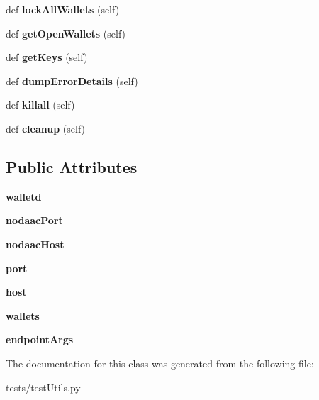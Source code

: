 \begin{DoxyCompactItemize}
def {\bfseries lock\+All\+Wallets} (self)
\item 
\mbox{\label{classtest_utils_1_1_wallet_mgr_aeb24c45ee41956221900c215dafb027b}} 
def {\bfseries get\+Open\+Wallets} (self)
\item 
\mbox{\label{classtest_utils_1_1_wallet_mgr_a8b541964d3b2bd917ad0cbc0997db653}} 
def {\bfseries get\+Keys} (self)
\item 
\mbox{\label{classtest_utils_1_1_wallet_mgr_aa83277d607aa6ad51845396521ff2aa5}} 
def {\bfseries dump\+Error\+Details} (self)
\item 
\mbox{\label{classtest_utils_1_1_wallet_mgr_accf01e611dcfc68cc60be6b7b5a286cc}} 
def {\bfseries killall} (self)
\item 
\mbox{\label{classtest_utils_1_1_wallet_mgr_ac7c46a635bb524b887419a8944ab5cc8}} 
def {\bfseries cleanup} (self)
\end{DoxyCompactItemize}
\subsection*{Public Attributes}
\begin{DoxyCompactItemize}
\item 
\mbox{\label{classtest_utils_1_1_wallet_mgr_a608af330737eec26c10a3aa41bde2659}} 
{\bfseries walletd}
\item 
\mbox{\label{classtest_utils_1_1_wallet_mgr_ad22648334307f3f17262c35cd50ea050}} 
{\bfseries nodaac\+Port}
\item 
\mbox{\label{classtest_utils_1_1_wallet_mgr_a699d9c5b7fb3cecc876c32e12ed9f68b}} 
{\bfseries nodaac\+Host}
\item 
\mbox{\label{classtest_utils_1_1_wallet_mgr_afbe25b1dd6e28d625fc14d6e65be1770}} 
{\bfseries port}
\item 
\mbox{\label{classtest_utils_1_1_wallet_mgr_ae162ab2f8345858a59dba1ac13ddd960}} 
{\bfseries host}
\item 
\mbox{\label{classtest_utils_1_1_wallet_mgr_abe300c7dbe7b267442f39a8fcdd7a4ff}} 
{\bfseries wallets}
\item 
\mbox{\label{classtest_utils_1_1_wallet_mgr_acceec90e63584352ef5409961ac5afa8}} 
{\bfseries endpoint\+Args}
\end{DoxyCompactItemize}


The documentation for this class was generated from the following file\+:\begin{DoxyCompactItemize}
\item 
tests/test\+Utils.\+py\end{DoxyCompactItemize}
